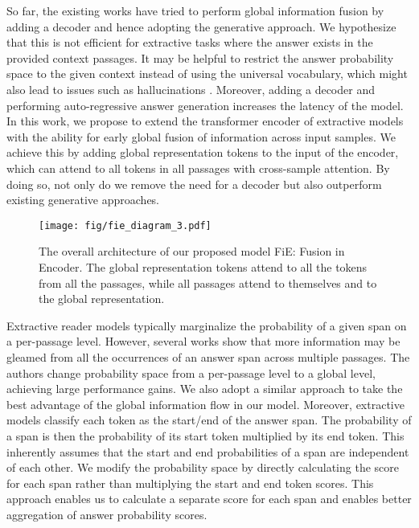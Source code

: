 \documentclass[11pt]{article}
\begin{document}
So far, the existing works have tried to perform global information fusion by adding a decoder and hence adopting the generative approach. We hypothesize that this is not efficient for extractive tasks where the answer exists in the provided context passages. It may be helpful to restrict the answer probability space to the given context instead of using the universal vocabulary, which might also lead to issues such as hallucinations \cite{rel-hallu-6, rel-hallu-5, rel-hallu-4, rel-hallu-3}. Moreover, adding a decoder and performing auto-regressive answer generation increases the latency of the model. In this work, we propose to extend the transformer encoder of extractive models with the ability for early global fusion of information across input samples. We achieve this by adding global representation tokens to the input of the encoder, which can attend to all tokens in all passages with cross-sample attention. By doing so, not only do we remove the need for a decoder but also outperform existing generative approaches.


\begin{figure*}[h!]
\texttt{[image: fig/fie\_diagram\_3.pdf]} 
\caption{The overall architecture of our proposed model FiE: Fusion in Encoder. The global representation tokens attend to all the tokens from all the passages, while all passages attend to themselves and to the global representation.}
\label{fie_architecture}
\end{figure*}


Extractive reader models typically \cite{orqa, dpr, realm} marginalize the probability of a given span on a per-passage level. However, several works \cite{prob-assum, cheng-etal-2021-unitedqa} show that more information may be gleamed from all the occurrences of an answer span across multiple passages. The authors change probability space from a per-passage level to a global level, achieving large performance gains. We also adopt a similar approach to take the best advantage of the global information flow in our model. Moreover, extractive models classify each token as the start/end of the answer span. The probability of a span is then the probability of its start token multiplied by its end token. This inherently assumes that the start and end probabilities of a span are independent of each other. We modify the probability space by directly calculating the score for each span rather than multiplying the start and end token scores. This approach enables us to calculate a separate score for each span and enables better aggregation of answer probability scores.
\end{document}
